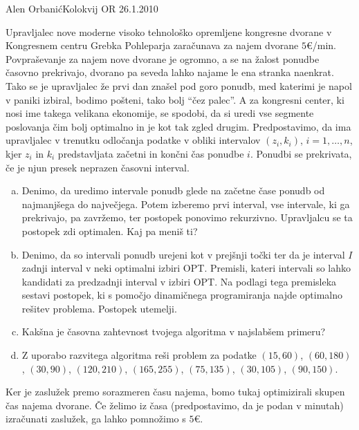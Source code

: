 \begin{naloga}{Alen Orbanić}{Kolokvij OR 26.1.2010}
\begin{vprasanje}
Upravljalec nove moderne visoko tehnološko opremljene kongresne dvorane
v Kongresnem centru Grebka Pohleparja zaračunava za najem dvorane $5 €$/min.
Povpraševanje za najem nove dvorane je ogromno,
a se na žalost ponudbe časovno prekrivajo,
dvorano pa seveda lahko najame le ena stranka naenkrat.
Tako se je upravljalec že prvi dan znašel pod goro ponudb,
med katerimi je napol v paniki izbiral,
bodimo pošteni, tako bolj ``čez palec''.
A za kongresni center, ki nosi ime takega velikana ekonomije, se spodobi,
da si uredi vse segmente poslovanja čim bolj optimalno
in je kot tak zgled drugim.
Predpostavimo,
da ima upravljalec v trenutku odločanja podatke v obliki intervalov
$(z_i, k_i)$, $i = 1, \dots, n$,
kjer $z_i$ in $k_i$ predstavljata začetni in končni čas ponudbe $i$.
Ponudbi se prekrivata, če je njun presek neprazen časovni interval.

\begin{enumerate}[(a)]
\item Denimo, da uredimo intervale ponudb
glede na začetne čase ponudb od najmanjšega do največjega.
Potem izberemo prvi interval, vse intervale, ki ga prekrivajo, pa zavržemo,
ter postopek ponovimo rekurzivno.
Upravljalcu se ta postopek zdi optimalen. Kaj pa meniš ti?

\item Denimo, da so intervali ponudb urejeni kot v prejšnji točki
ter da je interval $I$ zadnji interval v neki optimalni izbiri OPT.
Premisli,
kateri intervali so lahko kandidati za predzadnji interval v izbiri OPT.
Na podlagi tega premisleka sestavi postopek,
ki s pomočjo dinamičnega programiranja najde optimalno rešitev problema.
Postopek utemelji.

\item Kakšna je časovna zahtevnost tvojega algoritma v najslabšem primeru?

\item Z uporabo razvitega algoritma reši problem za podatke
$(15, 60)$, $(60, 180)$, $(30, 90)$, $(120, 210)$,
$(165, 255)$, $(75, 135)$, $(30, 105)$, $(90, 150)$.
\end{enumerate}
\end{vprasanje}

\begin{odgovor}
Ker je zaslužek premo sorazmeren času najema,
bomo tukaj optimizirali skupen čas najema dvorane.
Če želimo iz časa (predpostavimo, da je podan v minutah) izračunati zaslužek,
ga lahko pomnožimo s $5 €$.


\end{odgovor}
\end{naloga}
